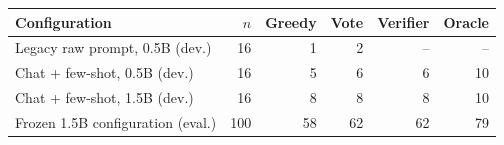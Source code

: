 \begin{tabular}{lrrrrr}
\toprule
Configuration & $n$ & Greedy & Vote & Verifier & Oracle \\
\midrule
Legacy raw prompt, 0.5B (dev.) & 16 & 1 & 2 & -- & -- \\
Chat + few-shot, 0.5B (dev.) & 16 & 5 & 6 & 6 & 10 \\
Chat + few-shot, 1.5B (dev.) & 16 & 8 & 8 & 8 & 10 \\
Frozen 1.5B configuration (eval.) & 100 & 58 & 62 & 62 & 79 \\
\bottomrule
\end{tabular}
